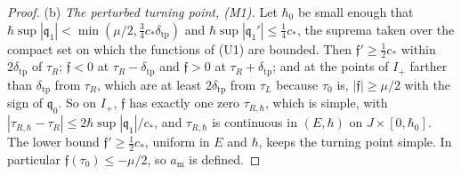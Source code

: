 \documentclass[aps,prd,onecolumn,tightenlines,nofootinbib,notitlepage,11pt,floatfix]{revtex4-2}
\theoremstyle{indentedtheorem}
\begin{document}
\begin{proof}
(b) \emph{The perturbed turning point, (M1).} Let $\hbar_0$ be small enough that $\hbar\sup|\mathfrak{q}_1|<\min(\mu/2,\tfrac{3}{4}c_*\delta_\text{tp})$ and $\hbar\sup|\mathfrak{q}_1'|\leq\tfrac{1}{4}c_*$, the suprema taken over the compact set on which the functions of (U1) are bounded. Then $\mathfrak{f}'\geq\tfrac{1}{2}c_*$ within $2\delta_\text{tp}$ of $\tau_R$; $\mathfrak{f}<0$ at $\tau_R-\delta_\text{tp}$ and $\mathfrak{f}>0$ at $\tau_R+\delta_\text{tp}$; and at the points of $I_+$ farther than $\delta_\text{tp}$ from $\tau_R$, which are at least $2\delta_\text{tp}$ from $\tau_L$ because $\tau_0$ is, $|\mathfrak{f}|\geq\mu/2$ with the sign of $\mathfrak{q}_0$. So on $I_+$, $\mathfrak{f}$ has exactly one zero $\tau_{R,\hbar}$, which is simple, with $|\tau_{R,\hbar}-\tau_R|\leq2\hbar\sup|\mathfrak{q}_1|/c_*$, and $\tau_{R,\hbar}$ is continuous in $(E,\hbar)$ on $J\times[0,\hbar_0]$. The lower bound $\mathfrak{f}'\geq\tfrac{1}{2}c_*$, uniform in $E$ and $\hbar$, keeps the turning point simple. In particular $\mathfrak{f}(\tau_0)\leq-\mu/2$, so $a_\text{m}$ is defined.


\end{proof}
\end{document}
